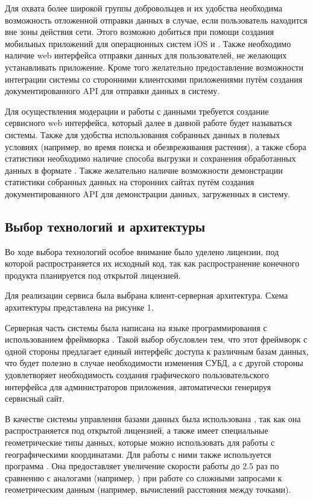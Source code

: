 \nwln
Для охвата более широкой группы добровольцев и их удобства необходима возможность отложенной отправки данных в случае, если пользователь находится вне зоны действия сети.
Этого возможно добиться при помощи создания мобильных приложений для операционных систем iOS и .
Также необходимо наличие web интерфейса отправки данных для пользователей, не желающих устанавливать приложение.
Кроме того желательно предоставление возможности интеграции системы со сторонними клиентскими приложениями путём создания документированного API для отправки данных в систему.

\nwln
Для осуществления модерации и работы с данными требуется создание сервисного web интерфейса, который далее в данной работе будет называться  системы.
Также для удобства использования собранных данных в полевых условиях (например, во время поиска и обезвреживания растения), а также сбора статистики необходимо наличие способа выгрузки и сохранения обработанных данных в формате .
Также желательно наличие возможности демонстрации статистики собранных данных на сторонних сайтах путём создания документированного API для демонстрации данных, загруженных в систему. \\

\subsection{Выбор технологий и архитектуры}

\tab
Во ходе выбора технологий особое внимание было уделено лицензии, под которой распространяется их исходный код, так как распространение конечного продукта планируется под открытой лицензией.

\nwln
Для реализации сервиса была выбрана клиент-серверная архитектура. Схема архитектуры представлена на рисунке 1. \\
\pictureone

\tab
Серверная часть системы была написана на языке программирования  с использованием фреймворка .
Такой выбор обусловлен тем, что этот фреймворк с одной стороны предлагает единый интерфейс доступа к различным базам данных, что будет полезно в случае необходимости изменения СУБД, а с другой стороны удовлетворяет необходимость создания графического пользовательского интерфейса для администраторов приложения, автоматически генерируя сервисный сайт.

\nwln
В качестве системы управления базами данных была использована , так как она распространяется под открытой лицензией, а также имеет специальные геометрические типы данных, которые можно использовать для работы с географическими координатами.
Для работы с ними также используется программа .
Она предоставляет увеличение скорости работы до 2.5 раз по сравнению с аналогами (например, ) при работе со сложными запросами к геометрическим данным (например, вычислений расстояния между точками)\cite{postgis-vs-mongo}.

